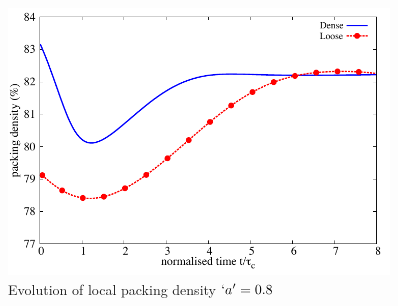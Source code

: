 \begin{figure}[h]
\centering
\includegraphics[width=0.9\textwidth]{voro_r18}
\caption{Evolution of local packing density $`a' = 0.8$}
\label{fig:voro_r18}
\end{figure}


